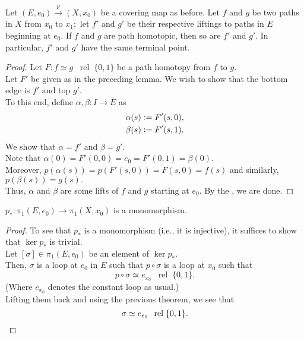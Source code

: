 \documentclass[12pt]{article}
\newcommand{\rel}{\;\;\operatorname{rel}\;}
\begin{document}
\begin{thm}  \label{thm:pathhomotlifts}
	Let $(E, e_0) \overset{p}{\longrightarrow} (X, x_0)$ be a covering map as before. Let $f$ and $g$ be two paths in $X$ from $x_0$ to $x_1;$ let $f'$ and $g'$ be their respective liftings to paths in $E$ beginning at $e_0.$ If $f$ and $g$ are path homotopic, then so are $f'$ and $g'.$ In particular, $f'$ and $g'$ have the same terminal point.
\end{thm}
\begin{proof} 
	Let $F:f\simeq g \rel \{0, 1\}$ be a path homotopy from $f$ to $g.$\\
	Let $F'$ be given as in the preceding lemma. We wish to show that the bottom edge is $f'$ and top $g'.$\\
	To this end, define $\alpha, \beta:I\to E$ as
	\begin{align*} 
		\alpha(s) &\vcentcolon= F'(s, 0),\\
		\beta(s) &\vcentcolon= F'(s, 1).
	\end{align*}
	We show that $\alpha = f'$ and $\beta = g'.$\\
	Note that $\alpha(0) = F'(0, 0) = e_0 = F'(0, 1) = \beta(0).$\\
	Moreover, $p(\alpha(s)) = p(F'(s, 0)) = F(s, 0) = f(s)$ and similarly, $p(\beta(s)) = g(s).$\\
	Thus, $\alpha$ and $\beta$ are some lifts of $f$ and $g$ starting at $e_0.$ By the , we are done.
\end{proof}

\begin{cor} \label{cor:coverhomomorphismismono}
	$p_* : \pi_1(E, e_0) \to \pi_1(X, x_0)$ is a monomorphism.
\end{cor}
\begin{proof} 
	To see that $p_*$ is a monomorphism (i.e., it is injective), it suffices to show that $\ker p_*$ is trivial.\\
	Let $[\sigma] \in \pi_1(E, e_0)$ be an element of $\ker p_*.$\\
	Then, $\sigma$ is a loop at $e_0$ in $E$ such that $p \circ \sigma$ is a loop at $x_0$ such that
	\begin{equation*} 
		p\circ \sigma \simeq e_{x_0} \rel \{0, 1\}.
	\end{equation*}
	(Where $e_{x_0}$ denotes the constant loop as usual.)\\
	Lifting them back and using the previous theorem, we see that
	\begin{equation*} 
		\sigma \simeq e_{e_0} \rel \{0, 1\}. \qedhere
	\end{equation*}
\end{proof}
\end{document}
